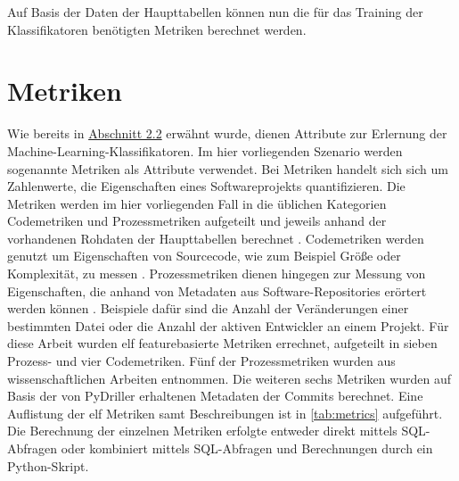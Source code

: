 Auf Basis der Daten der Haupttabellen können nun die für das Training der Klassifikatoren benötigten Metriken berechnet werden.

\section{Metriken}

Wie bereits in \hyperref[classification]{Abschnitt 2.2} erwähnt wurde, dienen Attribute zur Erlernung der Machine-Learning-Klassifikatoren. Im hier vorliegenden Szenario werden sogenannte Metriken als Attribute verwendet. Bei Metriken handelt sich sich um Zahlenwerte, die Eigenschaften eines Softwareprojekts quantifizieren. Die Metriken werden im hier vorliegenden Fall in die üblichen Kategorien Codemetriken und Prozessmetriken aufgeteilt und jeweils anhand der vorhandenen Rohdaten der Haupttabellen berechnet \cite{Rahman2013}. Codemetriken werden genutzt um Eigenschaften von Sourcecode, wie zum Beispiel \glqq Größe\grqq{} oder Komplexität, zu messen \cite{Rahman2013}. Prozessmetriken dienen hingegen zur Messung von Eigenschaften, die anhand von Metadaten aus Software-Repositories erörtert werden können \cite{Rahman2013}. Beispiele dafür sind die Anzahl der Veränderungen einer bestimmten Datei oder die Anzahl der aktiven Entwickler an einem Projekt. Für diese Arbeit wurden elf featurebasierte Metriken errechnet, aufgeteilt in sieben Prozess- und vier Codemetriken. Fünf der Prozessmetriken wurden aus wissenschaftlichen Arbeiten \cite{Rahman2013,Queiroz2016} entnommen. Die weiteren sechs Metriken wurden auf Basis der von PyDriller erhaltenen Metadaten der Commits berechnet. Eine Auflistung der elf Metriken samt Beschreibungen ist in \autoref{tab:metrics} aufgeführt. Die Berechnung der einzelnen Metriken erfolgte entweder direkt mittels SQL-Abfragen oder kombiniert mittels SQL-Abfragen und Berechnungen durch ein Python-Skript.

